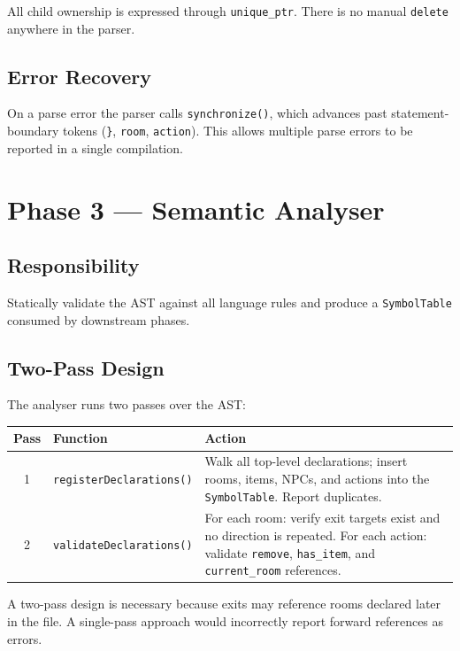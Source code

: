 \documentclass[12pt, a4paper]{article}
\begin{document}
All child ownership is expressed through \texttt{unique\_ptr}.
There is no manual \texttt{delete} anywhere in the parser.

\subsection{Error Recovery}
On a parse error the parser calls \texttt{synchronize()}, which advances past
statement-boundary tokens (\texttt{\}}, \texttt{room}, \texttt{action}).
This allows multiple parse errors to be reported in a single compilation.

\section{Phase 3 --- Semantic Analyser}

\subsection{Responsibility}
Statically validate the AST against all language rules and produce a
\texttt{SymbolTable} consumed by downstream phases.

\subsection{Two-Pass Design}

The analyser runs two passes over the AST:

\begin{center}
\begin{tabular}{clp{8cm}}
\toprule
\textbf{Pass} & \textbf{Function} & \textbf{Action} \\
\midrule
1 & \texttt{registerDeclarations()} &
  Walk all top-level declarations; insert rooms, items, NPCs, and actions into
  the \texttt{SymbolTable}. Report duplicates. \\
\midrule
2 & \texttt{validateDeclarations()} &
  For each room: verify exit targets exist and no direction is repeated.
  For each action: validate \texttt{remove}, \texttt{has\_item}, and
  \texttt{current\_room} references. \\
\bottomrule
\end{tabular}
\end{center}

A two-pass design is necessary because exits may reference rooms declared later
in the file.  A single-pass approach would incorrectly report forward references
as errors.
\end{document}
